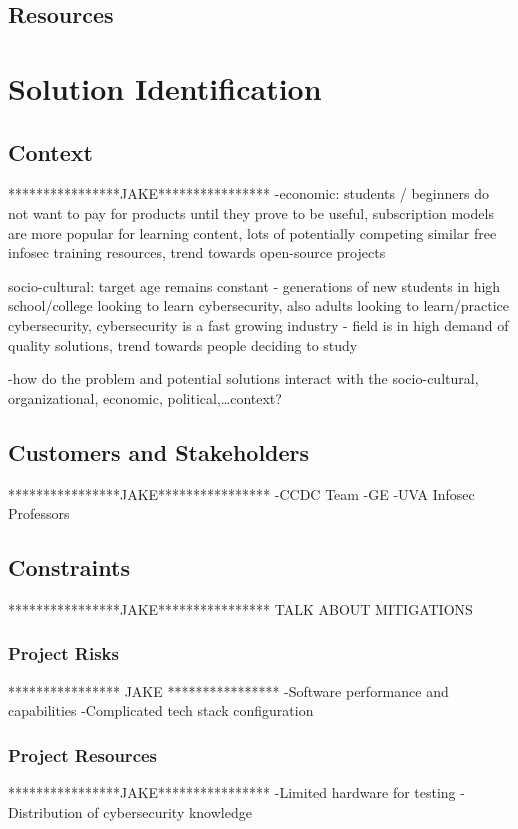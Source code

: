 \documentclass[openright]{report}
\begin{document}
\section{Resources}

\chapter{Solution Identification}

\section{Context}
****************JAKE****************
-economic: students / beginners do not want to pay for products until they prove to be useful, subscription models are more popular for learning content, lots of potentially competing similar free infosec training resources, trend towards open-source projects

socio-cultural: target age remains constant - generations of new students in high school/college looking to learn cybersecurity, also adults looking to learn/practice cybersecurity, cybersecurity is a fast growing industry - field is in high demand of quality solutions, trend towards people deciding to study 

-how do the problem and potential solutions interact with the socio-cultural, organizational, economic, political,…context? 

\section{Customers and Stakeholders}
****************JAKE****************
-CCDC Team
-GE
-UVA Infosec Professors

\section{Constraints}
****************JAKE****************
TALK ABOUT MITIGATIONS

\subsection{Project Risks}
**************** JAKE ****************
-Software performance and capabilities
-Complicated tech stack configuration

\subsection{Project Resources}
****************JAKE****************
-Limited hardware for testing
-Distribution of cybersecurity knowledge
\end{document}
